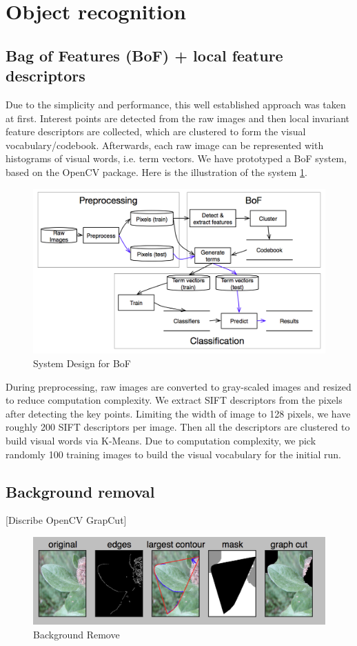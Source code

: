 \documentclass[journal]{IEEEtran}
\begin{document}
\section{Object recognition}
\subsection{Bag of Features (BoF) + local feature descriptors}
   Due to the simplicity and performance, this well established approach was taken at first. Interest points are detected from the raw images and then local invariant feature descriptors are collected, which are clustered to form the visual vocabulary/codebook. Afterwards, each raw image can be represented with histograms of visual words, i.e. term vectors.  We have prototyped a BoF system, based on the OpenCV package.  Here is the illustration of the system \ref{fig:bofsystemdesign}.
\newpage
\begin{figure}
  \centering
  \includegraphics[scale=0.2]{flowchart}
  \caption{ System Design for BoF }
  \label{fig:bofsystemdesign}
\end{figure}
During preprocessing, raw images are converted to gray-scaled images and resized to reduce computation complexity. We extract SIFT descriptors from the pixels after detecting the key points. Limiting the width of image to 128 pixels, we have roughly 200 SIFT descriptors per image. Then all the descriptors are clustered to build visual words via K-Means. Due to computation complexity, we pick randomly 100 training images to build the visual vocabulary for the initial run.
\subsection{Background removal}
[Discribe OpenCV GrapCut]
\newpage
\begin{figure}
  \centering
  \includegraphics[scale=0.2]{backgroundremoval}
  \caption{ Background Remove }
  \label{fig:backgroundremoval}
\end{figure}
\end{document}
